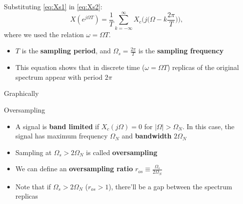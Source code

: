 \documentclass[10pt]{beamer}
\begin{document}
%
\begin{frame}
Substituting \eqref{eq:Xs1} in \eqref{eq:Xs2}:
\begin{equation*}
X(e^{j\Omega T}) = \frac{1}{T}\sum_{k=-\infty}^{\infty} X_c\Big(j\Big(\Omega - k\frac{2\pi}{T}\Big)\Big),
\end{equation*}
where we used the relation $\omega = \Omega T$.

\begin{itemize}
	\item $T$ is the \textbf{sampling period}, and $\Omega_s = \frac{2\pi}{T}$ is the \textbf{sampling frequency}
	\item This equation shows that in discrete time ($\omega = \Omega T$) replicas of the original spectrum appear with period $2\pi$
\end{itemize}

\end{frame}

\begin{frame}{Graphically}
\vspace{-0.4cm}
\begin{center}
	\resizebox{0.85\linewidth}{!}{}
\end{center}
\vspace{-0.4cm}
\end{frame}

\begin{frame}{Oversampling}
\begin{itemize}
	\item A signal is \textbf{band limited} if $X_c(j\Omega) = 0$ for $|\Omega| > \Omega_N$. In this case, the signal has maximum frequency $\Omega_N$ and \textbf{bandwidth} $2\Omega_N$
	\item Sampling at $\Omega_s > 2\Omega_N$ is called \textbf{oversampling}
	\item We can define an \textbf{oversampling ratio} $r_{os}\equiv \frac{\Omega_s}{2\Omega_N}$
	\item Note that if $\Omega_s > 2\Omega_N$ ($r_{os} > 1$), there'll be a gap between the spectrum replicas
\end{itemize}

\begin{center}
\end{center}
\end{frame}
\end{document}
